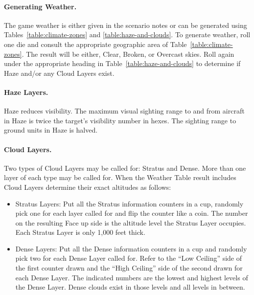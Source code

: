 \begin{advancedrules}
{{\paragraph{Generating Weather.} The game weather is either given in the scenario notes or can be generated using Tables~\ref{table:climate-zones} and \ref{table:haze-and-clouds}. To generate weather, roll one die and consult the appropriate geographic area of Table~\ref{table:climate-zones}. The result will be either, Clear, Broken, or Overcast skies. Roll again under the appropriate heading in Table~\ref{table:haze-and-clouds} to determine if Haze and/or any Cloud Layers exist.
}

\paragraph{Haze Layers.}   Haze reduces visibility. The maximum visual sighting range to and from aircraft in Haze is twice the target's visibility number in hexes. The sighting range to ground units in Haze is halved.

\paragraph{Cloud Layers.} Two types of Cloud Layers may be called for: Stratus and Dense. More than one layer of each type may be called for. When the Weather Table result includes Cloud Layers determine their exact altitudes as follows:

\begin{itemize}
    \item Stratus Layers: Put all the Stratus information counters in a cup, randomly pick one for each layer called for and flip the counter like a coin. The number on the resulting Face up side is the altitude level the Stratus Layer occupies. Each Stratus Layer is only 1,000 feet thick.

    \item Dense Layers: Put all the Dense information counters in a cup and randomly pick two for each Dense Layer called for. Refer to the “Low Ceiling” side of the first counter drawn and the “High Ceiling” side of the second drawn for each Dense Layer. The indicated numbers are the lowest and highest levels of the Dense Layer. Dense clouds exist in those levels and all levels in between.   
\end{itemize}


}
\end{advancedrules}
